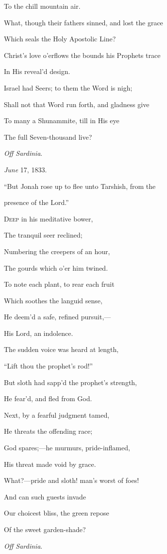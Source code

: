 To the chill
mountain air.

What, though their fathers sinned, and lost the grace

Which seals the Holy Apostolic Line?

Christ's love o'erflows the bounds his Prophets trace

In His reveal'd
design.

Israel had Seers; to them the Word is nigh;

Shall not that Word run forth, and gladness
give

To many a Shunammite, till in His eye

The full Seven-thousand live?

\emph{Off Sardinia}.

\emph{June} 17, 1833.


``But Jonah rose up to flee unto Tarshish,
from the

presence
of the Lord.''

D\textsc{eep} in his meditative bower,

The tranquil seer reclined;

Numbering the creepers of an hour,

The gourds which o'er him twined.

To note each plant, to rear each fruit

Which soothes the languid sense,

He deem'd a safe, refined pursuit,—

His Lord, an indolence.

The sudden voice was heard at length,

``Lift thou the prophet's rod!''

But sloth had sapp'd the prophet's strength,

He fear'd, and fled from God. 

Next, by a fearful judgment tamed,

He threats the offending race;

God spares;—he murmurs, pride-inflamed,

His threat made void by grace.

What?—pride and sloth! man's worst of foes!

And can such guests invade

Our choicest bliss, the green repose

Of the sweet garden-shade?

\emph{Off Sardinia}.

